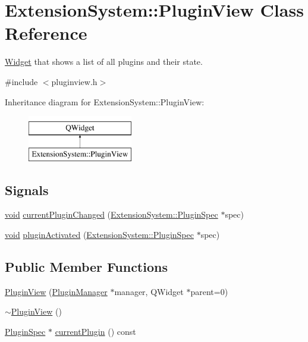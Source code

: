 \hypertarget{class_extension_system_1_1_plugin_view}{\section{Extension\-System\-:\-:Plugin\-View Class Reference}
\label{class_extension_system_1_1_plugin_view}
}


\hyperlink{class_widget}{Widget} that shows a list of all plugins and their state.  




{\ttfamily \#include $<$pluginview.\-h$>$}

Inheritance diagram for Extension\-System\-:\-:Plugin\-View\-:\begin{figure}[H]
\begin{center}
\leavevmode
\includegraphics[height=2.000000cm]{class_extension_system_1_1_plugin_view}
\end{center}
\end{figure}
\subsection*{Signals}
\begin{DoxyCompactItemize}
\item 
\hyperlink{group___u_a_v_objects_plugin_ga444cf2ff3f0ecbe028adce838d373f5c}{void} \hyperlink{class_extension_system_1_1_plugin_view_acb8afbec2c244b6c5225a576e86c3c01}{current\-Plugin\-Changed} (\hyperlink{class_extension_system_1_1_plugin_spec}{Extension\-System\-::\-Plugin\-Spec} $\ast$spec)
\item 
\hyperlink{group___u_a_v_objects_plugin_ga444cf2ff3f0ecbe028adce838d373f5c}{void} \hyperlink{class_extension_system_1_1_plugin_view_a0455a1c8215732176c5555d88517f5e5}{plugin\-Activated} (\hyperlink{class_extension_system_1_1_plugin_spec}{Extension\-System\-::\-Plugin\-Spec} $\ast$spec)
\end{DoxyCompactItemize}
\subsection*{Public Member Functions}
\begin{DoxyCompactItemize}
\item 
\hyperlink{class_extension_system_1_1_plugin_view_afaa4ceb9c0931e0bcb90508176381016}{Plugin\-View} (\hyperlink{class_extension_system_1_1_plugin_manager}{Plugin\-Manager} $\ast$manager, Q\-Widget $\ast$parent=0)
\item 
\hyperlink{class_extension_system_1_1_plugin_view_adb39058a5108137ed5347791914f0f64}{$\sim$\-Plugin\-View} ()
\item 
\hyperlink{class_extension_system_1_1_plugin_spec}{Plugin\-Spec} $\ast$ \hyperlink{class_extension_system_1_1_plugin_view_a2b442b927989161117846bd89b4e0809}{current\-Plugin} () const 
\end{DoxyCompactItemize}


